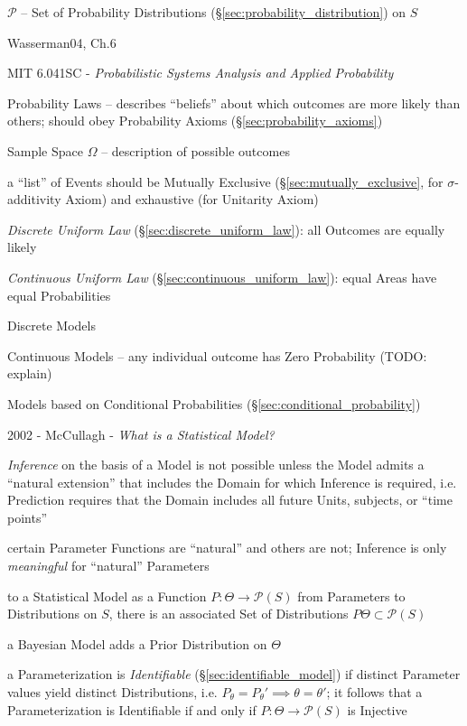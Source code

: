 $\mathcal{P}$ -- Set of Probability Distributions
(\S\ref{sec:probability_distribution}) on $S$

Wasserman04, Ch.6

\asterism

MIT 6.041SC - \emph{Probabilistic Systems Analysis and Applied Probability}

Probability Laws -- describes ``beliefs'' about which outcomes are more likely
than others; should obey Probability Axioms (\S\ref{sec:probability_axioms})

Sample Space $\Omega$ -- description of possible outcomes

a ``list'' of Events should be Mutually Exclusive
(\S\ref{sec:mutually_exclusive}, for $\sigma$-additivity Axiom) and exhaustive
(for Unitarity Axiom)

\emph{Discrete Uniform Law} (\S\ref{sec:discrete_uniform_law}): all Outcomes are
equally likely

\emph{Continuous Uniform Law} (\S\ref{sec:continuous_uniform_law}): equal Areas
have equal Probabilities

Discrete Models

Continuous Models -- any individual outcome has Zero Probability (TODO: explain)

Models based on Conditional Probabilities (\S\ref{sec:conditional_probability})

\asterism

2002 - McCullagh - \emph{What is a Statistical Model?}

\emph{Inference} on the basis of a Model is not possible unless the Model admits
a ``natural extension'' that includes the Domain for which Inference is
required, i.e. Prediction requires that the Domain includes all future Units,
subjects, or ``time points''

certain Parameter Functions are ``natural'' and others are not; Inference is
only \emph{meaningful} for ``natural'' Parameters

to a Statistical Model as a Function $P : \Theta \to \mathcal{P}(S)$
from Parameters to Distributions on $S$, there is an associated Set of
Distributions $P \Theta \subset \mathcal{P}(S)$

a Bayesian Model adds a Prior Distribution on $\Theta$

a Parameterization is \emph{Identifiable} (\S\ref{sec:identifiable_model}) if
distinct Parameter values yield distinct Distributions, i.e. $P_\theta =
P_\theta' \implies \theta = \theta'$; it follows that a Parameterization is
Identifiable if and only if $P : \Theta \to \mathcal{P}(S)$ is Injective

